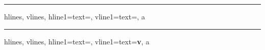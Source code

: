 \documentclass{article}
\begin{document}
\START
\hrule\bigskip

\begin{tblr}{
  hlines,
  vlines,
  hline{1}={text={}},
  vline{1}={text={}},
}
  a
\end{tblr}
\ENDTEST

\bigskip\hrule\bigskip

\begin{tblr}{
  hlines,
  vlines,
  hline{1}={text={\def\x{}}},
  vline{1}={text={\textbf{v}}},
}
  a
\end{tblr}
\ENDTEST
\end{document}
